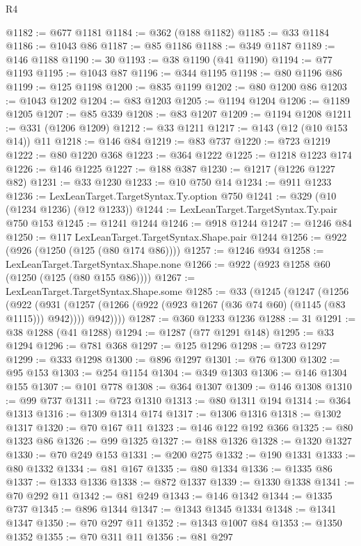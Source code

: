 \begin{lexlean}{R4}
\begin{coremodule}
@1182 := @677 @1181
@1184 := @362 (@188 @1182)
@1185 := @33 @1184
@1186 := @1043 @86
@1187 := @85 @1186
@1188 := @349 @1187
@1189 := @146 @1188
@1190 := 30
@1193 := @38 @1190 (@41 @1190)
@1194 := @77 @1193
@1195 := @1043 @87
@1196 := @344 @1195
@1198 := @80 @1196 @86
@1199 := @125 @1198
@1200 := @835 @1199
@1202 := @80 @1200 @86
@1203 := @1043 @1202
@1204 := @83 @1203
@1205 := @1194 @1204
@1206 := @1189 @1205
@1207 := @85 @339
@1208 := @83 @1207
@1209 := @1194 @1208
@1211 := @331 (@1206 @1209)
@1212 := @33 @1211
@1217 := @143 (@12 (@10 @153 @14)) @11
@1218 := @146 @84
@1219 := @83 @737
@1220 := @723 @1219
@1222 := @80 @1220 @368
@1223 := @364 @1222
@1225 := @1218 @1223 @174
@1226 := @146 @1225
@1227 := @188 @387
@1230 := @1217 (@1226 @1227 @82)
@1231 := @33 @1230
@1233 := @10 @750 @14
@1234 := @911 @1233
@1236 := LexLeanTarget.TargetSyntax.Ty.option @750
@1241 := @329 (@10 (@1234 @1236) (@12 @1233))
@1244 := LexLeanTarget.TargetSyntax.Ty.pair @750 @153
@1245 := @1241 @1244
@1246 := @918 @1244
@1247 := @1246 @84
@1250 := @117 LexLeanTarget.TargetSyntax.Shape.pair @1244
@1256 := @922 (@926 (@1250 (@125 (@80 @174 @86))))
@1257 := @1246 @934
@1258 := LexLeanTarget.TargetSyntax.Shape.none
@1266 := @922 (@923 @1258 @60 (@1250 (@125 (@80 @155 @86))))
@1267 := LexLeanTarget.TargetSyntax.Shape.some
@1285 := @33
    (@1245
      (@1247
        (@1256
          (@922
            (@931 (@1257 (@1266 (@922 (@923 @1267 (@36 @74 @60) (@1145 (@83 @1115))) @942))))
            @942))))
@1287 := @360 @1233 @1236
@1288 := 31
@1291 := @38 @1288 (@41 @1288)
@1294 := @1287 (@77 @1291 @148)
@1295 := @33 @1294
@1296 := @781 @368
@1297 := @125 @1296
@1298 := @723 @1297
@1299 := @333 @1298
@1300 := @896 @1297
@1301 := @76 @1300
@1302 := @95 @153
@1303 := @254 @1154
@1304 := @349 @1303
@1306 := @146 @1304 @155
@1307 := @101 @778
@1308 := @364 @1307
@1309 := @146 @1308
@1310 := @99 @737
@1311 := @723 @1310
@1313 := @80 @1311 @194
@1314 := @364 @1313
@1316 := @1309 @1314 @174
@1317 := @1306 @1316
@1318 := @1302 @1317
@1320 := @70 @167 @11
@1323 := @146 @122 @192 @366
@1325 := @80 @1323 @86
@1326 := @99 @1325
@1327 := @188 @1326
@1328 := @1320 @1327
@1330 := @70 @249 @153
@1331 := @200 @275
@1332 := @190 @1331
@1333 := @80 @1332
@1334 := @81 @167
@1335 := @80 @1334
@1336 := @1335 @86
@1337 := @1333 @1336
@1338 := @872 @1337
@1339 := @1330 @1338
@1341 := @70 @292 @11
@1342 := @81 @249
@1343 := @146 @1342
@1344 := @1335 @737
@1345 := @896 @1344
@1347 := @1343 @1345 @1334
@1348 := @1341 @1347
@1350 := @70 @297 @11
@1352 := @1343 @1007 @84
@1353 := @1350 @1352
@1355 := @70 @311 @11
@1356 := @81 @297

\end{coremodule}
\end{lexlean}

